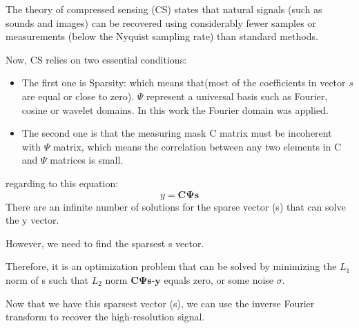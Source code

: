 \documentclass[10pt,aspectratio=169,dvipsnames]{beamer} %
\newcommand{\bs}[1]{\boldsymbol{#1}}
\begin{document}
	{	
		\tiny
		The theory of compressed sensing (CS) states that natural signals (such as sounds and images) can be recovered using considerably fewer samples or measurements (below the Nyquist sampling rate) than standard methods.
		
		Now, CS relies on two essential conditions: 	
		\begin{itemize}
			\item The first one is Sparsity: which means that(\alert{most of the coefficients in vector \(s\) are equal or close to zero}).
			$\Psi$ represent a universal basis such as Fourier, cosine or wavelet domains.
			In this work the Fourier domain was applied. 
			\item The second one is that the measuring mask C matrix must be incoherent with \(\Psi\) matrix, which means the correlation between any two elements in C and $\Psi$ matrices is small.
		\end{itemize}		
		
		regarding to this equation: 
		\begin{equation}
			y = \bs{C}\bs{\Psi}\bs{s}
		\end{equation}
		There are an infinite number of solutions for the sparse vector (s) that can solve the y vector.
		
		However, we need to find the sparsest s vector.
		
		Therefore, it is an optimization problem that can be solved by minimizing the \(L_1\) norm of s such that \(L_2\) norm \(\bs{C}\bs{\Psi}\bs{s}\)-\(\bs{y}\) equals zero, or some noise $\sigma$.
		
		Now that we have this sparsest vector (s), we can use the inverse Fourier transform to recover the high-resolution signal.		
		
	}
\end{document}
